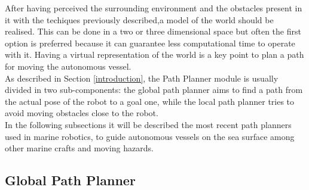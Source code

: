 \documentclass[12pt]{article}
\begin{document}
      After having perceived the surrounding environment and the obstacles present in it with the techiques previously described,a model of the world should be realised. This can be done in a two or three dimensional space but often the first option is preferred because it can guarantee less computational time to operate with it. Having a virtual representation of the world is a key point to plan a path for moving the autonomous vessel.\\
      As described in Section \ref{introduction},  the Path Planner module is usually divided in two sub-components: the global path planner aims to find a path from the actual pose of the robot to a goal one, while the local path planner tries to avoid moving obstacles close to the robot.\\
      \indent In the following subsections it will be described the most recent path planners used in marine robotics, to guide autonomous vessels on the sea surface among other marine crafts and moving hazards.

        \subsection{Global Path Planner} \label{gpp}
\end{document}

